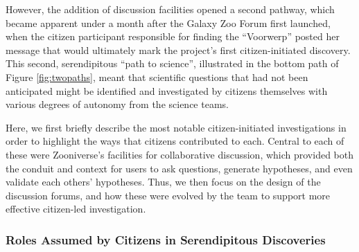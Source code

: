 \documentclass{sigchi}
\begin{document}
However, the addition of discussion facilities opened a second pathway, which became apparent under a month after the Galaxy Zoo Forum first launched, when the citizen participant responsible for finding the ``Voorwerp'' posted her message that would ultimately mark the project's first citizen-initiated discovery.  This second, serendipitous ``path to science'', illustrated in the bottom path of Figure \ref{fig:twopaths}, meant that scientific questions that had not been anticipated might be identified and investigated by citizens themselves with various degrees of autonomy from the science teams.

Here, we first briefly describe the most notable citizen-initiated investigations in order to highlight the ways that citizens contributed to each.  Central to each of these were Zooniverse's facilities for collaborative discussion, which provided both the conduit and  context for users to ask questions, generate hypotheses, and even validate each others' hypotheses.  Thus, we then focus on the design of the discussion forums, and how these were evolved by the team to support more effective citizen-led investigation. 

\subsubsection{Roles Assumed by Citizens in Serendipitous Discoveries}
\end{document}
